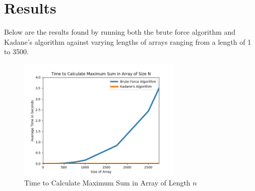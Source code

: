 \documentclass[10pt, letterpaper]{article}
\begin{document}
	\section{Results}

Below are the results found by running both the brute force algorithm and Kadane's algorithm against varying lengths of arrays ranging from a length of 1 to 3500.

	\begin{figure}[htbp]
		\begin{center}
			\includegraphics[width=0.70\textwidth]{python/avgTimeGraph.png}
			\caption{Time to Calculate Maximum Sum in Array of Length $n$}
			\label{fig:time-graph}
		\end{center}
	\end{figure}
\end{document}
